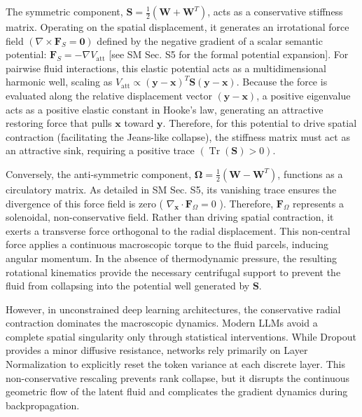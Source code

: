 \documentclass[10pt]{article}
\begin{document}
The symmetric component, $\mathbf{S}=\frac{1}{2}\left(\mathbf{W}+\mathbf{W}^{T}\right)$, acts as a conservative stiffness matrix. Operating on the spatial displacement, it generates an irrotational force field $\left(\nabla \times \mathbf{F}_{S}=\mathbf{0}\right)$ defined by the negative gradient of a scalar semantic potential: $\mathbf{F}_{S}=-\nabla V_{\mathrm{att}}$ [see SM Sec. S5 for the formal potential expansion]. For pairwise fluid interactions, this elastic potential acts as a multidimensional harmonic well, scaling as $V_{\mathrm{att}} \propto(\mathbf{y}-\mathbf{x})^{T} \mathbf{S}(\mathbf{y}-\mathbf{x})$. Because the force is evaluated along the relative displacement vector $(\mathbf{y}-\mathbf{x})$, a positive eigenvalue acts as a positive elastic constant in Hooke's law, generating an attractive restoring force that pulls $\mathbf{x}$ toward $\mathbf{y}$. Therefore, for this potential to drive spatial contraction (facilitating the Jeans-like collapse), the stiffness matrix must act as an attractive sink, requiring a positive trace $(\operatorname{Tr}(\mathbf{S})>0)$.

Conversely, the anti-symmetric component, $\boldsymbol{\Omega}= \frac{1}{2}\left(\mathbf{W}-\mathbf{W}^{T}\right)$, functions as a circulatory matrix. As detailed in SM Sec. S5, its vanishing trace ensures the divergence of this force field is zero ( $\nabla_{\mathbf{x}} \cdot \mathbf{F}_{\Omega}=0$ ). Therefore, $\mathbf{F}_{\Omega}$ represents a solenoidal, non-conservative field. Rather than driving spatial contraction, it exerts a transverse force orthogonal to the radial displacement. This non-central force applies a continuous macroscopic torque to the fluid parcels, inducing angular momentum. In the absence of thermodynamic pressure, the resulting rotational kinematics provide the necessary centrifugal support to prevent the fluid from collapsing into the potential well generated by $\mathbf{S}$.

However, in unconstrained deep learning architectures, the conservative radial contraction dominates the macroscopic dynamics. Modern LLMs avoid a complete spatial singularity only through statistical interventions. While Dropout provides a minor diffusive resistance, networks rely primarily on Layer Normalization \cite{ref12,ref13} to explicitly reset the token variance at each discrete layer. This non-conservative rescaling prevents rank collapse, but it disrupts the continuous geometric flow of the latent fluid and complicates the gradient dynamics during backpropagation.
\end{document}
